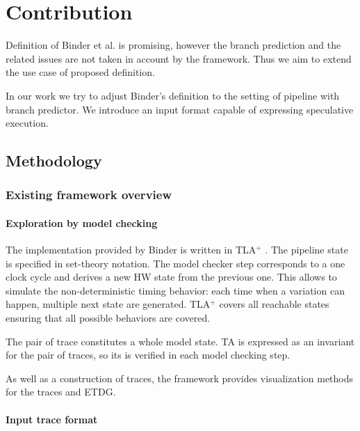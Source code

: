 \chapter{Contribution}

Definition of Binder et al. \cite{binder_definitions_2022} is promising, however the branch prediction and the related issues are not taken in account by the framework. Thus we aim to extend the use case of proposed definition.

In our work we try to adjust Binder's definition to the setting of pipeline with branch predictor. We introduce an input format capable of expressing speculative execution. 


\section{Methodology}

\subsection{Existing framework overview}

\subsubsection{Exploration by model checking}

The implementation provided by Binder is written in TLA$^+$ \cite{lamport_specifying_2003}. The pipeline state is specified in set-theory notation. The model checker step corresponds to a one clock cycle and derives a new HW state from the previous one. This allows to simulate the non-deterministic timing behavior: each time when a variation can happen, multiple next state are generated. TLA$^+$ covers all reachable states ensuring that all possible behaviors are covered.

The pair of trace constitutes a whole model state. TA is expressed as an invariant for the pair of traces, so its is verified in each model checking step. 

As well as a construction of traces, the framework provides visualization methods for the traces and ETDG.


\subsubsection{Input trace format}

